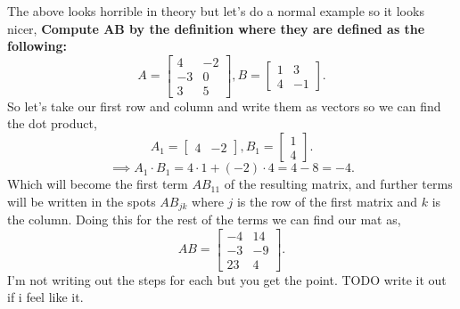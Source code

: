\documentclass{report}
\begin{document}
\begin{multicols}{2}
The above looks horrible in theory but let's do a normal example so it looks nicer, \textbf{Compute AB by the definition where they are defined as the following:}
\[
	A=\begin{bmatrix} 4 & -2 \\ -3 & 0 \\ 3 & 5 \end{bmatrix} , B=\begin{bmatrix} 1 & 3 \\ 4 & -1 \end{bmatrix}
.\] 
So let's take our first row and column and write them as vectors so we can find the dot product,
\[
A_1 = \begin{bmatrix} 4 & -2 \end{bmatrix} , B_1 = \begin{bmatrix} 1 \\ 4 \end{bmatrix}
.\] 
\[
\implies A_1 \cdot B_1 = 4 \cdot 1 + (-2) \cdot 4 = 4 - 8 = -4
.\] 
Which will become the first term $ AB_{ 11 } $ of the resulting matrix, and further terms will be written in the spots $ AB_{ jk } $ where $ j $ is the row of the first matrix and $ k $ is the column. Doing this for the rest of the terms we can find  our mat as,
\[
AB= \begin{bmatrix} -4 & 14 \\ -3 & -9 \\ 23 & 4 \end{bmatrix}
.\] 
I'm not writing out the steps for each but you get the point. TODO write it out if i feel like it.

\end{multicols}
\end{document}
